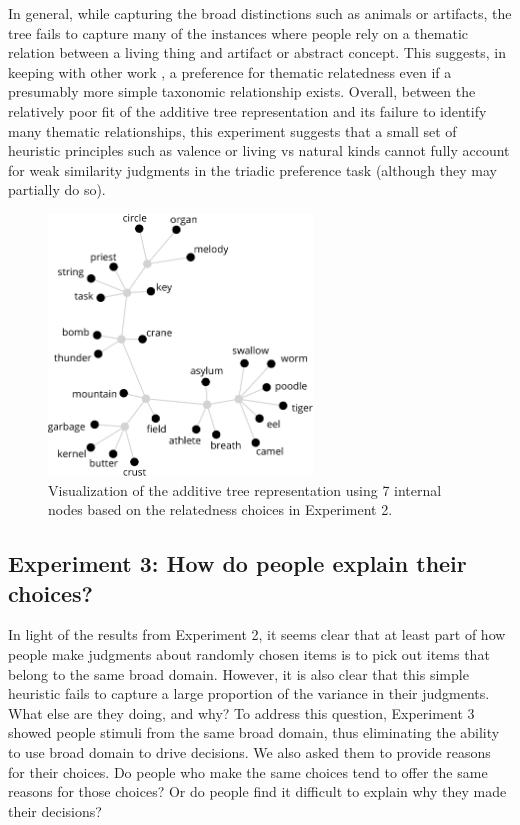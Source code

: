 \documentclass[doc]{apa6}
\begin{document}
In general, while capturing the broad distinctions such as animals or artifacts, the tree fails to capture many of the instances where people rely on a thematic relation between a living thing and artifact or abstract concept. This suggests, in keeping with other work \parencite{Lin2001,EstesGolonka2011}, a preference for thematic relatedness even if a presumably more simple taxonomic relationship exists.
Overall, between the relatively poor fit of the additive tree representation and its failure to identify many thematic relationships, this experiment suggests that a small set of heuristic principles such as valence or living vs natural kinds cannot fully account for weak similarity judgments in the triadic preference task (although they may partially do so).



\begin{figure}[t]
\centering
\includegraphics[width=7cm]{images/addTreeNodes10.pdf}
\caption{\small{Visualization of the additive tree representation using 7 internal nodes based on the relatedness choices in Experiment 2.}}
\label{fig:MDSClusteringSolution}
\end{figure}



\subsection{Experiment 3: How do people explain their choices?}

In light of the results from Experiment 2, it seems clear that at least part of how people make judgments about randomly chosen items is to pick out items that belong to the same broad domain. However, it is also clear that this simple heuristic fails to capture a large proportion of the variance in their judgments. What else are they doing, and why? To address this question, Experiment 3 showed people stimuli from the same broad domain, thus eliminating the ability to use broad domain to drive decisions. We also asked them to provide reasons for their choices. Do people who make the same choices tend to offer the same reasons for those choices? Or do people find it difficult to explain why they made their decisions?
\end{document}
